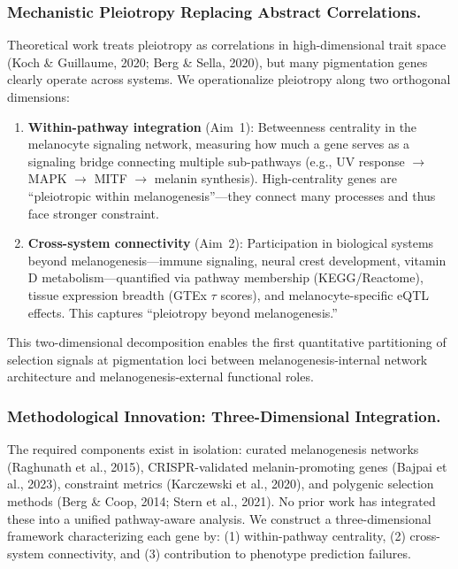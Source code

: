 \documentclass[11pt]{article}
\begin{document}
\subsubsection{Mechanistic Pleiotropy Replacing Abstract Correlations.}
Theoretical work treats pleiotropy as correlations in high-dimensional trait space (Koch \& Guillaume, 2020; Berg \& Sella, 2020), but many pigmentation genes clearly operate across systems. We operationalize pleiotropy along two orthogonal dimensions:

\begin{enumerate}[itemsep=2pt, topsep=2pt]
    \item \textbf{Within-pathway integration} (Aim~1): Betweenness centrality in the melanocyte signaling network, measuring how much a gene serves as a signaling bridge connecting multiple sub-pathways (e.g., UV response $\to$ MAPK $\to$ MITF $\to$ melanin synthesis). High-centrality genes are ``pleiotropic within melanogenesis''---they connect many processes and thus face stronger constraint.
    \item \textbf{Cross-system connectivity} (Aim~2): Participation in biological systems beyond melanogenesis---immune signaling, neural crest development, vitamin D metabolism---quantified via pathway membership (KEGG/Reactome), tissue expression breadth (GTEx $\tau$ scores), and melanocyte-specific eQTL effects. This captures ``pleiotropy beyond melanogenesis.''
\end{enumerate}

This two-dimensional decomposition enables the first quantitative partitioning of selection signals at pigmentation loci between melanogenesis-internal network architecture and melanogenesis-external functional roles.

\subsubsection{Methodological Innovation: Three-Dimensional Integration.}
The required components exist in isolation: curated melanogenesis networks (Raghunath et al., 2015), CRISPR-validated melanin-promoting genes (Bajpai et al., 2023), constraint metrics (Karczewski et al., 2020), and polygenic selection methods (Berg \& Coop, 2014; Stern et al., 2021). No prior work has integrated these into a unified pathway-aware analysis. We construct a three-dimensional framework characterizing each gene by: (1) within-pathway centrality, (2) cross-system connectivity, and (3) contribution to phenotype prediction failures.
\end{document}
